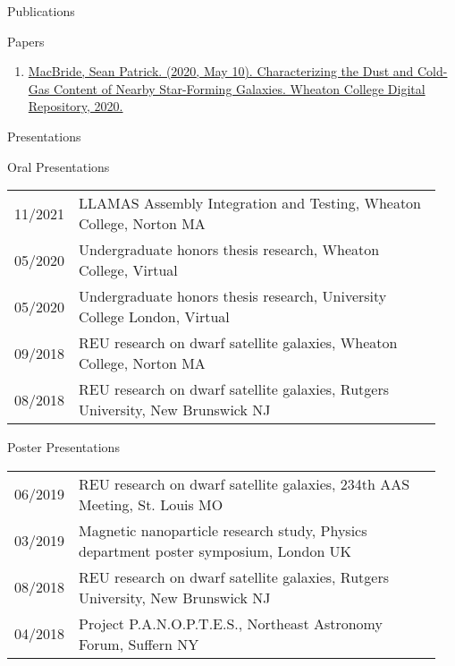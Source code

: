 \documentclass{resume} %
\begin{document}
\begin{rSection}{Publications}
    \begin{rSubsection}{Papers}{}{}{} %
        \begin{enumerate}
            \item \href{https://digitalrepository.wheatoncollege.edu/handle/11040/31192}{MacBride, Sean Patrick. (2020, May 10). Characterizing the Dust and Cold-Gas Content of Nearby Star-Forming Galaxies. Wheaton College Digital Repository, 2020.}
        \end{enumerate}
            
    \end{rSubsection}    
\end{rSection}

\begin{rSection}{Presentations}
\begin{rSubsection}{Oral Presentations}{}{}{}
    \begin{table}[h!]
\begin{tabular}{p{0.07\linewidth} p{0.88\linewidth}}
11/2021 & LLAMAS Assembly Integration and Testing, Wheaton College, Norton MA\\
05/2020 & Undergraduate honors thesis research, Wheaton College, Virtual\\ 
05/2020 & Undergraduate honors thesis research, University College London, Virtual\\
09/2018 & REU research on dwarf satellite galaxies, Wheaton College, Norton MA\\
08/2018 & REU research on dwarf satellite galaxies, Rutgers University, New Brunswick NJ\\
\end{tabular}
\end{table}
\end{rSubsection}
\newpage
\begin{rSubsection}{Poster Presentations}{}{}{}
     \begin{table}[h!]
        \begin{tabular}{p{0.07\linewidth} p{0.88\linewidth}}
            06/2019 & REU research on dwarf satellite galaxies, 234th AAS Meeting, St. Louis MO\\
            03/2019 & Magnetic nanoparticle research study, Physics department poster symposium, London UK\\
            08/2018 & REU research on dwarf satellite galaxies, Rutgers University, New Brunswick NJ\\
            04/2018 & Project P.A.N.O.P.T.E.S., Northeast Astronomy Forum, Suffern NY\\
        \end{tabular}
        \end{table}
\end{rSubsection}

\end{rSection}
\end{document}
